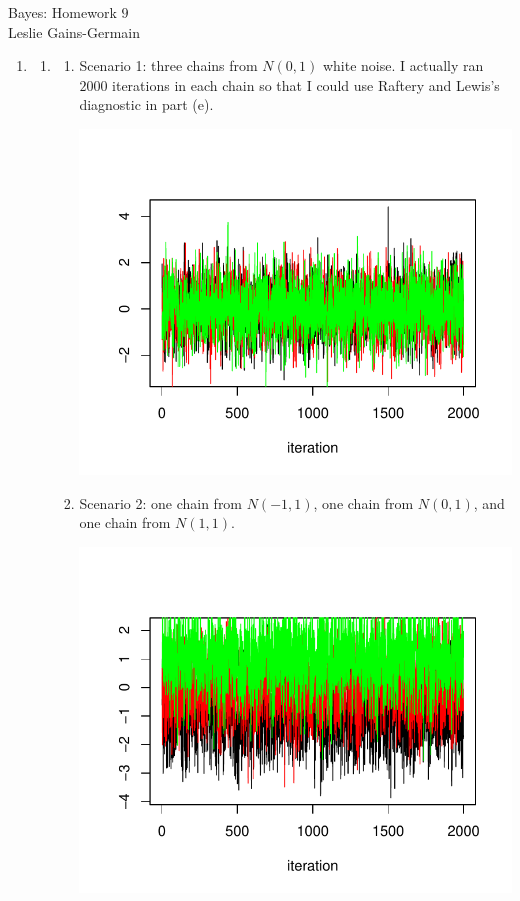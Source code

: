\documentclass[12pt]{article}\usepackage[]{graphicx}\usepackage[]{color}
\newenvironment{knitrout}{}{} %
\begin{document}
  
  
\begin{center}
\large{Bayes: Homework $9$} \\
Leslie Gains-Germain
\end{center}

\begin{doublespacing}

\begin{enumerate}

\item \begin{enumerate}

\item \begin{enumerate}

\item Scenario 1: three chains from $N(0, 1)$ white noise. I actually ran $2000$ iterations in each chain so that I could use Raftery and Lewis's diagnostic in part (e).
\begin{center}
\begin{knitrout}\footnotesize
{}\color{fgcolor}
\includegraphics[width=.5\linewidth]{figure/n01} 

\end{knitrout}
\end{center}

\item Scenario 2: one chain from $N(-1, 1)$, one chain from $N(0, 1)$, and one chain from $N(1, 1)$.
\begin{center}
\begin{knitrout}\footnotesize
{}\color{fgcolor}
\includegraphics[width=.5\linewidth]{figure/norms} 


\end{knitrout}
\end{center}
\end{enumerate}
\end{enumerate}
\end{enumerate}
\end{doublespacing}
\end{document}
